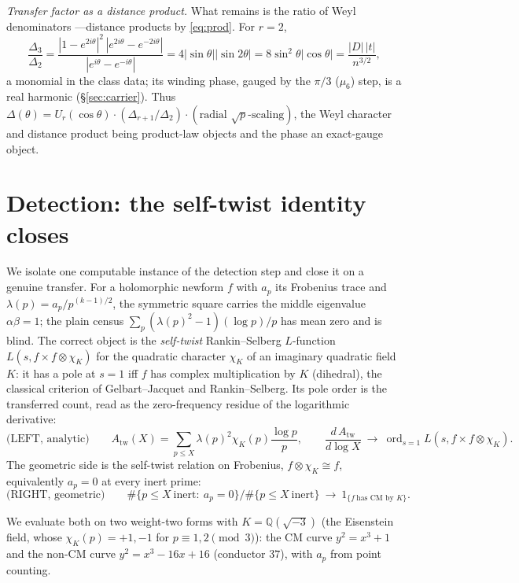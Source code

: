 \documentclass[11pt]{article}
\theoremstyle{definition}
\newcommand{\ord}{\operatorname{ord}}
\begin{document}
\emph{Transfer factor as a distance product.} What remains is the ratio of Weyl denominators
---distance products by \eqref{eq:prod}. For $r=2$,
\[
  \frac{\Delta_3}{\Delta_2}
  =\frac{|1-e^{2i\theta}|^2\,|e^{2i\theta}-e^{-2i\theta}|}{|e^{i\theta}-e^{-i\theta}|}
  =4|\sin\theta||\sin2\theta|=8\sin^2\theta|\cos\theta|=\frac{|D|\,|t|}{n^{3/2}},
\]
a monomial in the class data; its winding phase, gauged by the $\pi/3$ ($\mu_6$) step, is a real
harmonic (\S\ref{sec:carrier}). Thus $\Delta(\theta)=U_r(\cos\theta)\cdot(\Delta_{r+1}/\Delta_2)
\cdot(\text{radial }\sqrt p\text{-scaling})$, the Weyl character and distance product being product-law
objects and the phase an exact-gauge object.

\section{Detection: the self-twist identity closes}\label{sec:detect}

We isolate one computable instance of the detection step and close it on a genuine transfer. For a
holomorphic newform $f$ with $a_p$ its Frobenius trace and $\lambda(p)=a_p/p^{(k-1)/2}$, the
symmetric square carries the middle eigenvalue $\alpha\beta=1$; the plain census
$\sum_p(\lambda(p)^2-1)(\log p)/p$ has mean zero and is blind. The correct object is the
\emph{self-twist} Rankin--Selberg $L$-function $L(s,f\times f\otimes\chi_K)$ for the quadratic
character $\chi_K$ of an imaginary quadratic field $K$: it has a pole at $s=1$ iff $f$ has complex
multiplication by $K$ (dihedral), the classical criterion of Gelbart--Jacquet \cite{GJ} and
Rankin--Selberg.
Its pole order is the transferred count, read as the zero-frequency residue of the logarithmic
derivative:
\[
  \text{(LEFT, analytic)}\qquad
  A_{\mathrm{tw}}(X)=\sum_{p\le X}\lambda(p)^2\chi_K(p)\frac{\log p}{p},\qquad
  \frac{d\,A_{\mathrm{tw}}}{d\log X}\ \longrightarrow\ \ord_{s=1}L(s,f\times f\otimes\chi_K).
\]
The geometric side is the self-twist relation on Frobenius, $f\otimes\chi_K\cong f$, equivalently
$a_p=0$ at every inert prime:
\[
  \text{(RIGHT, geometric)}\qquad
  \#\{p\le X\ \text{inert}:\ a_p=0\}\big/\#\{p\le X\ \text{inert}\}\ \longrightarrow\ 1_{\{f\ \text{has CM by }K\}}.
\]

We evaluate both on two weight-two forms with $K=\mathbb Q(\sqrt{-3})$ (the Eisenstein field, whose
$\chi_K(p)=+1,-1$ for $p\equiv1,2\pmod3$): the CM curve $y^2=x^3+1$ and the non-CM curve
$y^2=x^3-16x+16$ (conductor $37$), with $a_p$ from point counting.
\end{document}
